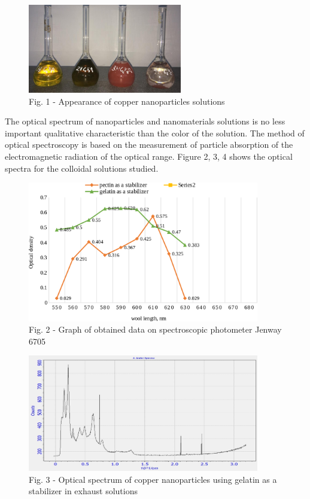 \begin{figure}[H]
	\centering
	\includegraphics[width=0.6\textwidth]{assets/14}
	\caption*{Fig. 1 - Appearance of copper nanoparticles solutions}
\end{figure}

\begin{multicols}{2}
The optical spectrum of nanoparticles and nanomaterials solutions is no
less important qualitative characteristic than the color of the
solution. The method of optical spectroscopy is based on the measurement
of particle absorption of the electromagnetic radiation of the optical
range. Figure 2, 3, 4 shows the optical spectra for the colloidal
solutions studied.
\end{multicols}

\begin{figure}[H]
	\centering
	\includegraphics[width=0.9\textwidth]{assets/14.1}
	\caption*{Fig. 2 - Graph of obtained data on spectroscopic photometer Jenway 6705}
\end{figure}

\begin{figure}[H]
	\centering
	\includegraphics[width=0.9\textwidth]{assets/15}
	\caption*{Fig. 3 - Optical spectrum of copper nanoparticles using gelatin as a stabilizer in exhaust solutions}
\end{figure}

